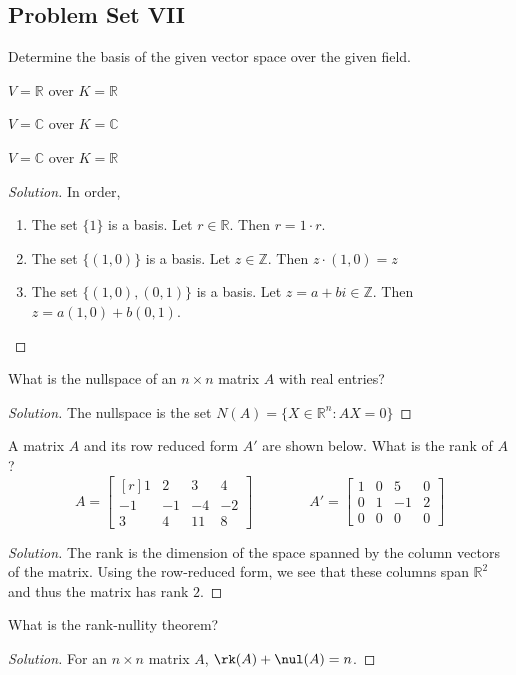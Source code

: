 \documentclass[crop=false,class=book,oneside]{standalone}
\begin{document}
\subsection{Problem Set VII}
\begin{problem}
Determine the basis of the given vector space over the given field.
\begin{enumerate}
\begin{multicols}{3}
    \item $V=\mathbb{R}$ over $K=\mathbb{R}$
    \item $V=\mathbb{C}$ over $K=\mathbb{C}$
    \item $V=\mathbb{C}$ over $K=\mathbb{R}$
\end{multicols}
\end{enumerate}
\end{problem}
\begin{proof}[Solution]
In order,
\begin{enumerate}
    \item The set $\{1\}$ is a basis. Let $r \in \mathbb{R}$. Then $r=1\cdot r$.
    \item The set $\{(1,0)\}$ is a basis. Let $z\in \mathbb{Z}$. Then $z\cdot(1,0) = z$
    \item The set $\{(1,0),(0,1)\}$ is a basis. Let $z=a+bi\in \mathbb{Z}$. Then $z = a(1,0)+b(0,1)$.
\end{enumerate}
\end{proof}
\begin{problem}
What is the nullspace of an $n\times n$ matrix $A$ with real entries?
\end{problem}
\begin{proof}[Solution]
The nullspace is the set $N(A) = \{X\in \mathbb{R}^n: AX = 0\}$
\end{proof}
\begin{problem}
A matrix $A$ and its row reduced form $A'$ are shown below. What is the rank of $A$?
\begin{equation*}
    A=\begin{bmatrix*}[r] 1 & 2 & 3 & 4 \\ -1 & -1 & -4 & -2 \\ 3 & 4 & 11 & 8 \end{bmatrix*} \quad\quad\quad\quad A' = \begin{bmatrix} 1 & 0 & 5 & 0 \\ 0 & 1 & -1 & 2 \\ 0 & 0 & 0 & 0 \end{bmatrix}
\end{equation*}
\end{problem}
\begin{proof}[Solution]
The rank is the dimension of the space spanned by the column vectors of the matrix. Using the row-reduced form, we see that these columns span $\mathbb{R}^2$ and thus the matrix has rank $2$.
\end{proof}
\begin{problem}
What is the rank-nullity theorem?
\end{problem}
\begin{proof}[Solution]
For an $n\times n$ matrix $A$, $\rk(A)+\nul(A) = n$.
\end{proof}
\newpage
\end{document}

